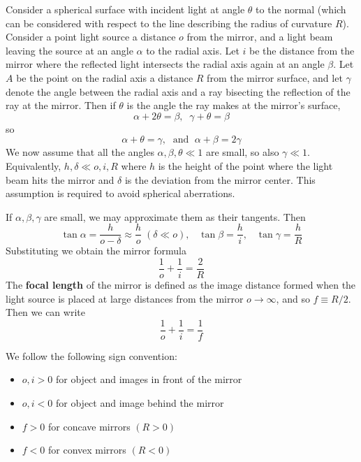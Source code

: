 \documentclass[12pt, a4paper, oneside, openright, titlepage]{book}
\begin{document}
Consider a spherical surface with incident light at angle $\theta$ to the normal (which can be considered with respect to the line describing the radius of curvature $R$). Consider a point light source a distance $o$ from the mirror, and a light beam leaving the source at an angle $\alpha$ to the radial axis. Let $i$ be the distance from the mirror where the reflected light intersects the radial axis again at an angle $\beta$. Let $A$ be the point on the radial axis a distance $R$ from the mirror surface, and let $\gamma$ denote the angle between the radial axis and a ray bisecting the reflection of the ray at the mirror. Then if $\theta$ is the angle the ray makes at the mirror's surface,
\begin{equation*}
    \alpha + 2\theta = \beta,\;\;\gamma+\theta = \beta
\end{equation*}
so
\begin{equation*}
    \alpha+\theta=\gamma,\;\text{ and }\;\alpha+\beta = 2\gamma
\end{equation*}
We now assume that all the angles $\alpha,\beta,\theta \ll 1$ are small, so also $\gamma \ll 1$. Equivalently, $h,\delta\ll o,i,R$ where $h$ is the height of the point where the light beam hits the mirror and $\delta$ is the deviation from the mirror center. This assumption is required to avoid spherical aberrations.


If $\alpha,\beta,\gamma$ are small, we may approximate them as their tangents. Then
\begin{equation*}
    \tan\alpha = \frac{h}{o-\delta} \approx \frac{h}{o}\;(\delta\ll o),\;\;\;\tan\beta = \frac{h}{i},\;\;\;\tan\gamma = \frac{h}{R}
\end{equation*}
Substituting we obtain the mirror formula
\begin{equation*}
    \frac{1}{o} + \frac{1}{i} = \frac{2}{R}
\end{equation*}
The \textbf{focal length} of the mirror is defined as the image distance formed when the light source is placed at large distances from the mirror $o \rightarrow \infty$, and so $f \equiv R/2$. Then we can write
\begin{equation*}
    \frac{1}{o}+\frac{1}{i}=\frac{1}{f}
\end{equation*}

We follow the following sign convention:
\begin{itemize}
    \item $o,i > 0$ for object and images in front of the mirror
    \item $o,i < 0$ for object and image behind the mirror
    \item $f > 0$ for concave mirrors $(R > 0)$
    \item $f < 0$ for convex mirrors $(R < 0)$
\end{itemize}
\end{document}
